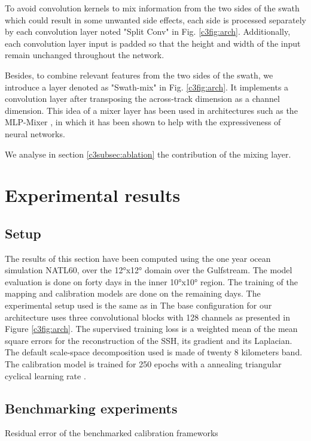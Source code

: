 \begin{bibunit}
To avoid convolution kernels to mix information from the two sides of the swath which could result in some unwanted side effects, each side is processed separately by each convolution layer noted "Split Conv" in Fig. \ref{c3fig:arch}. Additionally, each convolution layer input is padded so that the height and width of the input remain unchanged throughout the network.

Besides, to combine relevant features from the two sides of the swath, we introduce a layer denoted as "Swath-mix" in Fig. \ref{c3fig:arch}. It implements a convolution layer after transposing the across-track dimension as a channel dimension. This idea of a mixer layer has been used in architectures such as the MLP-Mixer \cite{mlpmixer}, in which it has been shown to help with the expressiveness of neural networks.


We analyse in section \ref{c3subsec:ablation} the contribution of the mixing layer.

\section{Experimental results}
\label{c3sec:results}

\subsection{Setup}
\noindent
The results of this section have been computed using the one year ocean simulation NATL60, over the 12°x12° domain over the Gulfstream. The model evaluation is done on forty days in the inner 10°x10° region. The training of the mapping and calibration models are done on the remaining days.
The experimental setup used is the same as in \cite{osse_data_challenge}
The base configuration for our architecture uses three convolutional blocks with 128 channels as presented in Figure \ref{c3fig:arch}.
The supervised training loss is a weighted mean of the mean square errors for the reconstruction of the SSH, its gradient and its Laplacian.
The default scale-space decomposition used is made of twenty 8 kilometers band.
The calibration model is trained for 250 epochs with a annealing triangular cyclical learning rate \cite{Smith_2017}.

\subsection{Benchmarking experiments}
\label{c3subsec:main_res}
\noindent

\begin{table}[t]
\begin{center}

\end{center}
\caption{Residual error of the benchmarked calibration frameworks}
\label{c3table:main}
\end{table}


\end{bibunit}
